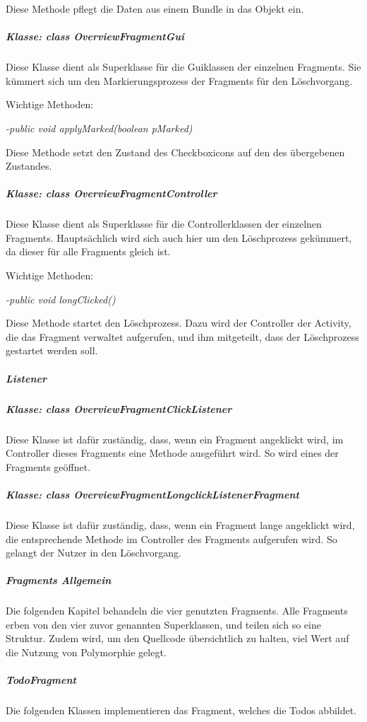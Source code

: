 Diese Methode pflegt die Daten aus einem Bundle in das Objekt ein.

\subparagraph*{Klasse: class OverviewFragmentGui}

Diese Klasse dient als Superklasse für die Guiklassen der einzelnen Fragments. Sie kümmert sich um den Markierungsprozess der Fragments für den Löschvorgang.

Wichtige Methoden:

\textit{-public void applyMarked(boolean pMarked)}

Diese Methode setzt den Zustand des Checkboxicons auf den des übergebenen Zustandes.

\subparagraph*{Klasse: class OverviewFragmentController}

Diese Klasse dient als Superklasse für die Controllerklassen der einzelnen Fragments. Hauptsächlich wird sich auch hier um den Löschprozess gekümmert, da dieser für alle Fragments gleich ist.

Wichtige Methoden:

\textit{-public void longClicked()}

Diese Methode startet den Löschprozess. Dazu wird der Controller der Activity, die das Fragment verwaltet aufgerufen, und ihm mitgeteilt, dass der Löschprozess gestartet werden soll.

\subparagraph{Listener}

\subparagraph*{Klasse: class OverviewFragmentClickListener}

Diese Klasse ist dafür zuständig, dass, wenn ein Fragment angeklickt wird, im Controller dieses Fragments eine Methode ausgeführt wird. So wird eines der Fragments geöffnet.

\subparagraph*{Klasse: class OverviewFragmentLongclickListenerFragment}

Diese Klasse ist dafür zuständig, dass, wenn ein Fragment lange angeklickt wird, die entsprechende Methode im Controller des Fragments aufgerufen wird. So gelangt der Nutzer in den Löschvorgang.

\subparagraph{Fragments Allgemein}

Die folgenden Kapitel behandeln die vier genutzten Fragments. Alle Fragments erben von den vier zuvor genannten Superklassen, und teilen sich so eine Struktur. Zudem wird, um den Quellcode übersichtlich zu halten, viel Wert auf die Nutzung von Polymorphie gelegt.

\subparagraph{TodoFragment}

Die folgenden Klassen implementieren das Fragment, welches die Todos abbildet.

